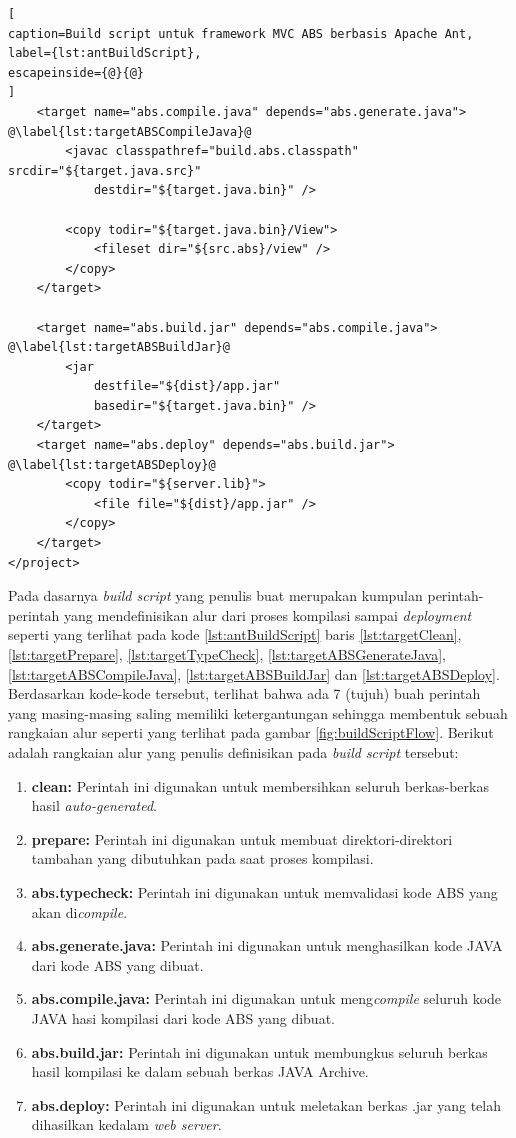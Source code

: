 \begin{lstlisting}[
caption=Build script untuk framework MVC ABS berbasis Apache Ant,
label={lst:antBuildScript},
escapeinside={@}{@}
]
	<target name="abs.compile.java" depends="abs.generate.java"> @\label{lst:targetABSCompileJava}@
		<javac classpathref="build.abs.classpath" srcdir="${target.java.src}"
			destdir="${target.java.bin}" />
			
		<copy todir="${target.java.bin}/View">
			<fileset dir="${src.abs}/view" />
		</copy>
	</target>
	
	<target name="abs.build.jar" depends="abs.compile.java"> @\label{lst:targetABSBuildJar}@
		<jar 
			destfile="${dist}/app.jar"
			basedir="${target.java.bin}" />
	</target>
	<target name="abs.deploy" depends="abs.build.jar"> @\label{lst:targetABSDeploy}@
		<copy todir="${server.lib}">
			<file file="${dist}/app.jar" />
		</copy>
	</target>
</project>
\end{lstlisting}

Pada dasarnya \textit{build script} yang penulis buat merupakan kumpulan perintah-perintah yang mendefinisikan alur dari proses kompilasi sampai \textit{deployment} seperti yang terlihat pada kode \ref{lst:antBuildScript} baris \ref{lst:targetClean}, \ref{lst:targetPrepare}, \ref{lst:targetTypeCheck}, \ref{lst:targetABSGenerateJava}, \ref{lst:targetABSCompileJava}, \ref{lst:targetABSBuildJar} dan \ref{lst:targetABSDeploy}. Berdasarkan kode-kode tersebut, terlihat bahwa ada 7 (tujuh) buah perintah yang masing-masing saling memiliki ketergantungan sehingga membentuk sebuah rangkaian alur seperti yang terlihat pada gambar \ref{fig:buildScriptFlow}. Berikut adalah rangkaian alur yang penulis definisikan pada \textit{build script} tersebut:

\begin{enumerate}
    \item \textbf{clean:} Perintah ini digunakan untuk membersihkan seluruh berkas-berkas hasil \textit{auto-generated}.
    \item \textbf{prepare:} Perintah ini digunakan untuk membuat direktori-direktori tambahan yang dibutuhkan pada saat proses kompilasi.
    \item \textbf{abs.typecheck:} Perintah ini digunakan untuk memvalidasi kode ABS yang akan di\textit{compile}.
    \item \textbf{abs.generate.java:} Perintah ini digunakan untuk menghasilkan kode JAVA dari kode ABS yang dibuat.
    \item \textbf{abs.compile.java:} Perintah ini digunakan untuk meng\textit{compile} seluruh kode JAVA hasi kompilasi dari kode ABS yang dibuat.
    \item \textbf{abs.build.jar:} Perintah ini digunakan untuk membungkus seluruh berkas hasil kompilasi ke dalam sebuah berkas JAVA Archive.
    \item \textbf{abs.deploy:} Perintah ini digunakan untuk meletakan berkas .jar yang telah dihasilkan kedalam \textit{web server}.
\end{enumerate}

